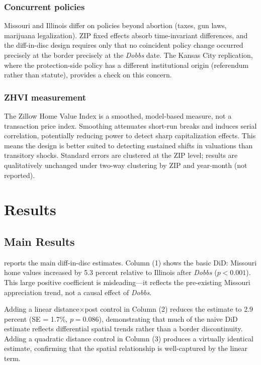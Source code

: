 \documentclass[12pt]{article}
\begin{document}
\subsubsection*{Concurrent policies} Missouri and Illinois differ on policies beyond abortion (taxes, gun laws, marijuana legalization). ZIP fixed effects absorb time-invariant differences, and the diff-in-disc design requires only that no coincident policy change occurred precisely at the border precisely at the \textit{Dobbs} date. The Kansas City replication, where the protection-side policy has a different institutional origin (referendum rather than statute), provides a check on this concern.

\subsubsection*{ZHVI measurement} The Zillow Home Value Index is a smoothed, model-based measure, not a transaction price index. Smoothing attenuates short-run breaks and induces serial correlation, potentially reducing power to detect sharp capitalization effects. This means the design is better suited to detecting sustained shifts in valuations than transitory shocks. Standard errors are clustered at the ZIP level; results are qualitatively unchanged under two-way clustering by ZIP and year-month (not reported).

\section{Results}
\label{sec:results}

\subsection{Main Results}



 reports the main diff-in-disc estimates. Column (1) shows the basic DiD: Missouri home values increased by 5.3 percent relative to Illinois after \textit{Dobbs} ($p < 0.001$). This large positive coefficient is misleading---it reflects the pre-existing Missouri appreciation trend, not a causal effect of \textit{Dobbs}.

Adding a linear distance$\times$post control in Column (2) reduces the estimate to 2.9 percent (SE = 1.7\%, $p = 0.086$), demonstrating that much of the naive DiD estimate reflects differential spatial trends rather than a border discontinuity. Adding a quadratic distance control in Column (3) produces a virtually identical estimate, confirming that the spatial relationship is well-captured by the linear term.
\end{document}
